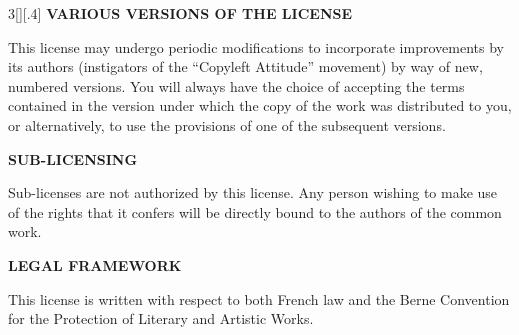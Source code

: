 \documentclass[8pt,a4paper]{article}
\begin{document}
\begin{multicols}{3}[][.4\paperwidth]
\textbf{VARIOUS VERSIONS OF THE LICENSE}

This license may undergo periodic modifications to incorporate improvements by its authors (instigators of the “Copyleft Attitude” movement) by way of new, numbered versions.
You will always have the choice of accepting the terms contained in the version under which the copy of the work was distributed to you, or alternatively, to use the provisions of one of the subsequent versions. 


\textbf{SUB-LICENSING}

Sub-licenses are not authorized by this license. Any person wishing to make use of the rights that it confers will be directly bound to the authors of the common work.


\textbf{LEGAL FRAMEWORK}

This license is written with respect to both French law and the Berne Convention for the Protection of Literary and Artistic Works.



\end{multicols}
\end{document}
